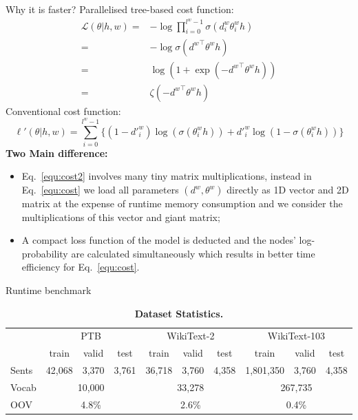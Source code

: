 \documentclass[final,t,unknownkeysallowed]{beamer}
\begin{document}
\begin{frame}{}
\begin{columns}[t]
\begin{column}{.3\linewidth}
	\begin{block}{Why it is faster?}
Parallelised tree-based cost function:
    \begin{equation}\label{equ:cost}
\begin{split}
   \mathcal{L}(\theta|h,w) =&-\log\prod_{i=0}^{l^w -1} \sigma(d_i^w \theta_{i}^w h) \\
    =& -\log \sigma({d^w}^\top \theta^w h)\\
    =& \log (1+\exp(- {d^w}^\top \theta^w h )) \\
    =&  \zeta(- {d^w}^\top \theta^w h )
\end{split}
\end{equation}
    Conventional cost function:
    \begin{equation}\label{equ:cost2}
    \ell'(\theta|h,w) =\sum_{i=0}^{l^w-1} \{(1-d'^w_i)\log (\sigma(\theta_{i}^w h))  + {d'^w_i}\log (1-\sigma (\theta_{i}^w h))\}
    \end{equation}
    \textbf{Two Main difference:}
	\begin{itemize}
	\item Eq.~\ref{equ:cost2} involves many tiny matrix multiplications, instead in Eq.~\ref{equ:cost} we load all parameters $(d^w, \theta^w)$ directly as 1D vector and 2D matrix at the expense of runtime memory consumption and we consider the multiplications of this vector and giant matrix;
    \item A compact loss function of the model is deducted and the nodes' log-probability are calculated simultaneously which results in better time efficiency for Eq.~\ref{equ:cost}.
	\end{itemize}
      \end{block}
     
      \begin{block}{Runtime benchmark}
      \begin{table}\small
        \caption{\textbf{Dataset Statistics.}}
        \centering
        \begin{tabular}{l|ccc|ccc|ccc}
        \toprule
        &\multicolumn{3}{c|}{PTB}&\multicolumn{3}{c|}{WikiText-2}&\multicolumn{3}{c}{WikiText-103}  \\
        &train& valid&test&train& valid&test&train & valid &test\\ \midrule
        Sents & 42,068   & 3,370  & 3,761 &36,718   & 3,760 & 4,358& 1,801,350   & 3,760 & 4,358 \\\midrule
        Vocab &\multicolumn{3}{c|}{10,000}&\multicolumn{3}{c|}{33,278} & \multicolumn{3}{c}{ 267,735}\\
        OOV &\multicolumn{3}{c|}{4.8\% }&\multicolumn{3}{c|}{2.6\% } & \multicolumn{3}{c}{0.4\%} \\
        \bottomrule
        \end{tabular}
       \end{table}
      

\end{block}
\end{column}
\end{columns}
\end{frame}
\end{document}
